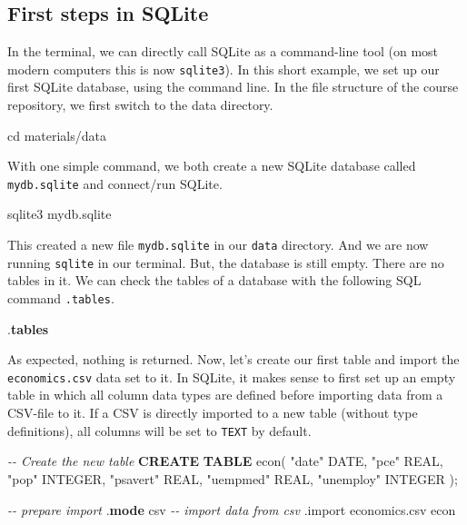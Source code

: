 \documentclass[
  12pt,
]{style/krantz}
\newenvironment{Shaded}{\begin{snugshade}}{\end{snugshade}}
\newcommand{\BuiltInTok}[1]{#1}
\newcommand{\CommentTok}[1]{\textcolor[rgb]{0.56,0.35,0.01}{\textit{#1}}}
\newcommand{\DataTypeTok}[1]{\textcolor[rgb]{0.13,0.29,0.53}{#1}}
\newcommand{\ExtensionTok}[1]{#1}
\newcommand{\KeywordTok}[1]{\textcolor[rgb]{0.13,0.29,0.53}{\textbf{#1}}}
\newcommand{\NormalTok}[1]{#1}
\newcommand{\OtherTok}[1]{\textcolor[rgb]{0.56,0.35,0.01}{#1}}
\begin{document}
\hypertarget{first-steps-in-sqlite}{%
\subsection{First steps in SQLite}\label{first-steps-in-sqlite}}

In the terminal, we can directly call SQLite as a command-line tool (on most modern computers this is now \texttt{sqlite3}). In this short example, we set up our first SQLite database, using the command line. In the file structure of the course repository, we first switch to the data directory.

\begin{Shaded}
\begin{Highlighting}[]
\BuiltInTok{cd}\NormalTok{ materials/data }
\end{Highlighting}
\end{Shaded}

With one simple command, we both create a new SQLite database called \texttt{mydb.sqlite} and connect/run SQLite.

\begin{Shaded}
\begin{Highlighting}[]
\ExtensionTok{sqlite3}\NormalTok{ mydb.sqlite}
\end{Highlighting}
\end{Shaded}

This created a new file \texttt{mydb.sqlite} in our \texttt{data} directory. And we are now running \texttt{sqlite} in our terminal. But, the database is still empty. There are no tables in it. We can check the tables of a database with the following SQL command \texttt{.tables}.

\begin{Shaded}
\begin{Highlighting}[]
\NormalTok{.}\KeywordTok{tables}
\end{Highlighting}
\end{Shaded}

As expected, nothing is returned. Now, let's create our first table and import the \texttt{economics.csv} data set to it. In SQLite, it makes sense to first set up an empty table in which all column data types are defined before importing data from a CSV-file to it. If a CSV is directly imported to a new table (without type definitions), all columns will be set to \texttt{TEXT} by default.

\begin{Shaded}
\begin{Highlighting}[]
\CommentTok{{-}{-} Create the new table}
\KeywordTok{CREATE} \KeywordTok{TABLE}\NormalTok{ econ(}
\OtherTok{"date"} \DataTypeTok{DATE}\NormalTok{,}
\OtherTok{"pce"} \DataTypeTok{REAL}\NormalTok{,}
\OtherTok{"pop"} \DataTypeTok{INTEGER}\NormalTok{,}
\OtherTok{"psavert"} \DataTypeTok{REAL}\NormalTok{,}
\OtherTok{"uempmed"} \DataTypeTok{REAL}\NormalTok{,}
\OtherTok{"unemploy"} \DataTypeTok{INTEGER}
\NormalTok{);}

\CommentTok{{-}{-} prepare import}
\NormalTok{.}\KeywordTok{mode}\NormalTok{ csv}
\CommentTok{{-}{-} import data from csv}
\NormalTok{.import economics.csv econ}
\end{Highlighting}
\end{Shaded}
\end{document}
